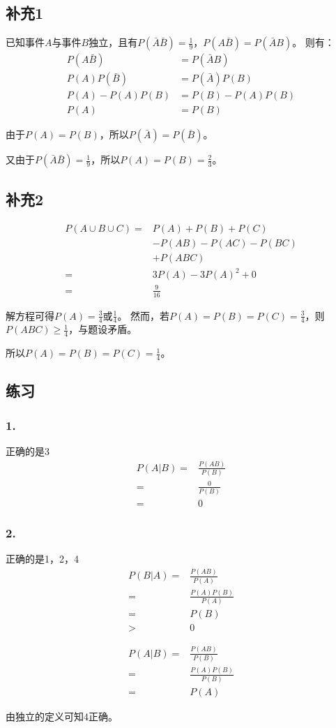 \documentclass[a4paper,12pt]{ctexart}
\begin{document}
\subsection*{补充1}
已知事件$A$与事件$B$独立，且有$P(\bar{A}\bar{B}) = \frac{1}{9}$，$P(A\bar{B}) = P(\bar{A}B)$。
则有：
\begin{align*}
	P(A\bar{B}) &= P(\bar{A}B)\\
	P(A)P(\bar{B}) &= P(\bar{A})P(B)\\
	P(A) - P(A)P(B) &= P(B) - P(A)P(B)\\
	P(A) &= P(B)
\end{align*}

由于$P(A) = P(B)$，所以$P(\bar{A}) = P(\bar{B})$。

又由于$P(\bar{A}\bar{B}) = \frac{1}{9}$，所以$P(A) = P(B) = \frac{2}{3}$。

\subsection*{补充2}
\begin{align*}
	P(A\cup B\cup C) =& P(A) + P(B) + P(C)\\
	 &- P(AB) - P(AC) - P(BC)\\
	 &+ P(ABC)\\
	=& 3P(A) -3P(A)^2 + 0\\
	=& \frac{9}{16} 
\end{align*}

解方程可得$P(A) = \frac{3}{4}\text{或}\frac{1}{4}$。
然而，若$P(A) = P(B) = P(C) = \frac{3}{4}$，则$P(ABC) \geq \frac{1}{4}$，与题设矛盾。

所以$P(A) = P(B) = P(C) = \frac{1}{4}$。

\subsection*{练习}

\subsubsection*{1.}
正确的是3
\begin{align*}
	P(A|B) =& \frac{P(AB)}{P(B)}\\
	=& \frac{0}{P(B)}\\
	=& 0
\end{align*}

\subsubsection*{2.}
正确的是1，2，4
\begin{align*}
	P(B|A) =& \frac{P(AB)}{P(A)}\\
	=& \frac{P(A)P(B)}{P(A)}\\
	=& P(B)\\
	>& 0
\end{align*}

\begin{align*}
	P(A|B) =& \frac{P(AB)}{P(B)}\\
	=& \frac{P(A)P(B)}{P(B)}\\
	=& P(A)
\end{align*}

由独立的定义可知4正确。
\end{document}
